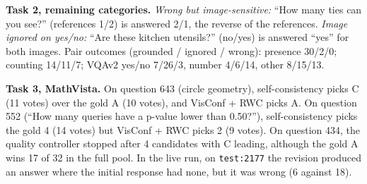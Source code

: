 \documentclass{article}
\begin{document}
\textbf{Task 2, remaining categories.} \emph{Wrong but image-sensitive:} ``How many ties can you see?'' (references 1/2) is answered 2/1, the reverse of the references. \emph{Image ignored on yes/no:} ``Are these kitchen utensils?'' (no/yes) is answered ``yes'' for both images. Pair outcomes (grounded / ignored / wrong): presence 30/2/0; counting 14/11/7; VQAv2 yes/no 7/26/3, number 4/6/14, other 8/15/13.

\textbf{Task 3, MathVista.} On question 643 (circle geometry), self-consistency picks C (11 votes) over the gold A (10 votes), and VisConf + RWC picks A. On question 552 (``How many queries have a p-value lower than 0.50?''), self-consistency picks the gold 4 (14 votes) but VisConf + RWC picks 2 (9 votes). On question 434, the quality controller stopped after 4 candidates with C leading, although the gold A wins 17 of 32 in the full pool. In the live run, on \texttt{test:2177} the revision produced an answer where the initial response had none, but it was wrong (6 against 18).
\end{document}
